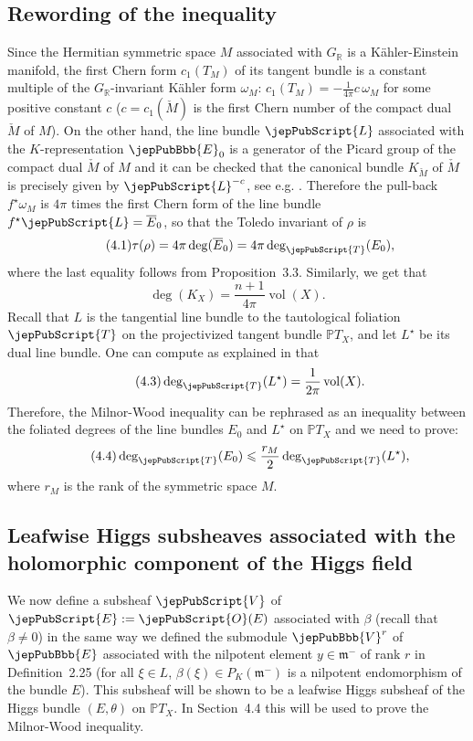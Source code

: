 \subsection{Rewording of the inequality}
Since the Hermitian symmetric space $M$ associated with $G_{\mathbb R}$ is a Kähler-Einstein manifold, the first Chern form $c_1(T_M)$ of its tangent bundle is a constant multiple of the $G_{\mathbb R}$-invariant Kähler form $\omega_M$: $c_1(T_M)=-\frac1{4\pi}c\,\omega_M$ for some positive constant $c$ ($c=c_1(\check M)$ is the first Chern number of the compact dual $\check M$ of $M$). On the other hand, the line bundle $\jepPubScript{L}$ associated with the $K$-representation $\jepPubBbb{E}_0$ is a generator of the Picard group of the compact dual $\check M$ of $M$ and it can be checked that the canonical bundle $K_{\check M}$ of $\check M$ is precisely given by $\jepPubScript{L}^{-c}$, see e.g. \cite[\S2]{jep93KM10}. Therefore the pull-back $f^\star\omega_M$ is $4\pi$ times the first Chern form of the line bundle $f^\star\jepPubScript{L}=\overline E_0$, so that the Toledo invariant of $\rho$ is
\begin{equation}\tag{4.1}
\tau(\rho)=4\pi\deg(\overline E_0)=4\pi\deg_{\jepPubScript{T}}(E_0),
\end{equation}
where the last equality follows from Proposition~3.3. Similarly, we get that
\begin{equation}\tag{4.2}
\deg(K_X)=\frac{n+1}{4\pi}\operatorname{vol}(X).
\end{equation}
Recall that $L$ is the tangential line bundle to the tautological foliation $\jepPubScript{T}$ on the projectivized tangent bundle $\mathbb PT_X$, and let $L^\star$ be its dual line bundle. One can compute as explained in \cite[\S4.3.1]{jep93KM17} that
\begin{equation}\tag{4.3}
\deg_{\jepPubScript{T}}(L^\star)=\frac1{2\pi}\operatorname{vol}(X).
\end{equation}
Therefore, the Milnor-Wood inequality can be rephrased as an inequality between the foliated degrees of the line bundles $E_0$ and $L^\star$ on $\mathbb PT_X$ and we need to prove:
\begin{equation}\tag{4.4}
\deg_{\jepPubScript{T}}(E_0)\leqslant\frac{r_M}{2}\deg_{\jepPubScript{T}}(L^\star),
\end{equation}
where $r_M$ is the rank of the symmetric space $M$.
\subsection{Leafwise Higgs subsheaves associated with the holomorphic component of the Higgs field}
We now define a subsheaf $\jepPubScript{V}$ of $\jepPubScript{E}:=\jepPubScript{O}(E)$ associated with $\beta$ (recall that $\beta\neq0$) in the same way we defined the submodule $\jepPubBbb{V}^r$ of $\jepPubBbb{E}$ associated with the nilpotent element $y\in\mathfrak m^-$ of rank $r$ in Definition~2.25 (for all $\xi\in L$, $\beta(\xi)\in P_K(\mathfrak m^-)$ is a nilpotent endomorphism of the bundle $E$). This subsheaf will be shown to be a leafwise Higgs subsheaf of the Higgs bundle $(E,\theta)$ on $\mathbb PT_X$. In Section~4.4 this will be used to prove the Milnor-Wood inequality.

